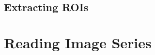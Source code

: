 \subsection{Extracting ROIs}
\label{sec:ExtractROI}



%

\section{Reading Image Series}
\label{sec:Reading Image Series}







